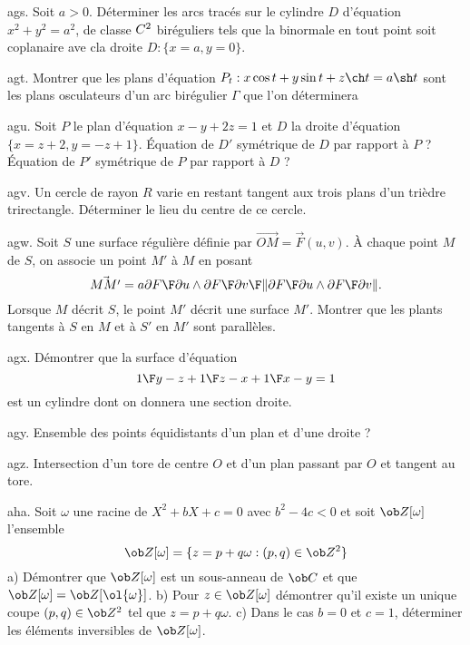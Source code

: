 \exo [Level=2,Fight=3,Learn=1,Field=\Surfaces,Type=\Exercices,Origin=\MP] ags. 
Soit $a>0$. Déterminer les arcs tracés sur le cylindre $D$ d'équation $x^2+y^2=a^2$, de classe $\sc C^2$ biréguliers 
tels que la binormale en tout point soit coplanaire  ave cla droite $D:\{x=a,y=0\}$. 

\exo [Level=2,Fight=3,Learn=1,Field=\Surfaces|\Enveloppes,Type=\Exercices,Origin=\MP] agt. 
Montrer que les plans d'équation $P_t:x\cos t+y\sin t+z\ch t=a\sh t$ sont les plans osculateurs d'un arc birégulier $\Gamma$ 
que l'on déterminera

\exo [Level=2,Fight=1,Learn=1,Field=\GéométrieSpatiale,Type=\Exercices,Origin=] agu. 
Soit $P$ le plan d'équation $x-y+2z=1$ et $D$ la droite d'équation $\{x=z+2,y=-z+1\}$. \pn
\'Equation de $D'$ symétrique de $D$ par rapport à $P$ ? \pn
\'Equation de $P'$ symétrique de $P$ par rapport à $D$ ?

\exo [Level=2,Fight=2,Learn=1,Field=\Surfaces,Type=\Exercices,Origin=\MP] agv. 
Un cercle de rayon $R$ varie en restant tangent aux trois plans d'un trièdre trirectangle. 
Déterminer le lieu du centre de ce cercle.  

\exo [Level=2,Fight=1,Learn=1,Field=\Surfaces,Type=\Exercices,Origin=] agw. 
Soit $S$ une surface régulière définie par $\vec{OM}=\vec F(u,v)$. 
\`A chaque point $M$ de $S$, on associe un point $M'$ à $M$ 
en posant 
$$
\vec{MM'}=a{{\partial F\F\partial u}\wedge{\partial F\F\partial v}\F\|{\partial F\F\partial u}\wedge{\partial F\F\partial v}\|}.
$$
Lorsque $M$ décrit $S$, le point $M'$ décrit une surface $M'$. 
Montrer que les plants tangents à $S$ en $M$ et à $S'$ en $M'$ sont parallèles. 

\exo [Level=2,Fight=0,Learn=0,Field=\Surfaces,Type=\Exercices,Origin=] agx. 
Démontrer que la surface d'équation 
$$
{1\F y-z}+{1\F z-x}+{1\F x-y}=1
$$ 
est un cylindre dont on donnera une section droite. 

\exo [Level=2,Fight=1,Learn=1,Field=\Surfaces,Type=\Exercices,Origin=] agy. 
Ensemble des points équidistants d'un plan et d'une droite ?

\exo [Level=2,Fight=2,Learn=1,Field=\Surfaces,Type=\Exercices,Origin=] agz. 
Intersection d'un tore de centre $O$ et d'un plan passant par $O$ et tangent au tore. 

\exo [Level=1,Fight=2,Learn=2,Field=\Anneaux,Type=\Exercices,Origin=] aha. 
Soit $\omega$ une racine de $X^2+bX+c=0$ avec $b^2-4c<0$ et soit $\ob Z[\omega]$ l'ensemble 
$$
\ob Z[\omega]=\{z=p+q\omega:(p,q)\in\ob Z^2\}
$$
a) Démontrer que $\ob Z[\omega]$ est un sous-anneau de $\ob C$ et que $\ob Z[\omega]=\ob Z[\ol{\omega}]$. \pn
b) Pour $z\in\ob Z[\omega]$ démontrer qu'il existe un unique coupe $(p,q)\in\ob Z^2$ tel que $z=p+q\omega$. \pn
c) Dans le cas $b=0$ et $c=1$, déterminer les éléments inversibles de $\ob Z[\omega]$. 

